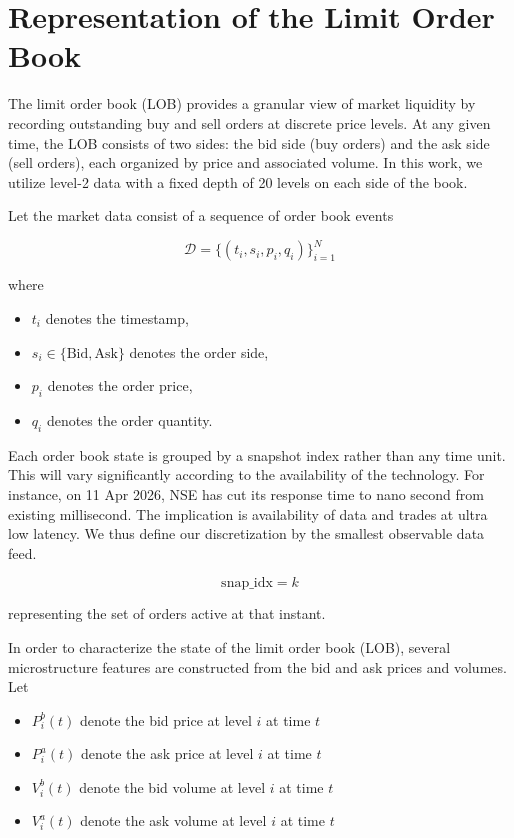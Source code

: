 \documentclass[12pt,a4paper]{report}
\begin{document}
\chapter{Representation of the Limit Order Book}

The limit order book (LOB) provides a granular view of market liquidity by recording outstanding buy and sell orders at discrete price levels. At any given time, the LOB consists of two sides: the bid side (buy orders) and the ask side (sell orders), each organized by price and associated volume. In this work, we utilize level-2 data with a fixed depth of 20 levels on each side of the book.

Let the market data consist of a sequence of order book events

\[
\mathcal{D} = \{(t_i, s_i, p_i, q_i)\}_{i=1}^{N}
\]

where

\begin{itemize}
\item $t_i$ denotes the timestamp,
\item $s_i \in \{\text{Bid}, \text{Ask}\}$ denotes the order side,
\item $p_i$ denotes the order price,
\item $q_i$ denotes the order quantity.
\end{itemize}

Each order book state is grouped by a snapshot index rather than any time unit. This will vary significantly according to the availability of the technology. For instance, on 11 Apr 2026, NSE has cut its response time to nano second from existing millisecond. The implication is  availability of data and trades at ultra low latency. We thus define our discretization by the smallest observable data feed.

\[
\text{snap\_idx} = k
\]

representing the set of orders active at that instant.

In order to characterize the state of the limit order book (LOB), several microstructure features are constructed from the bid and ask prices and volumes. Let

\begin{itemize}
\item $P_i^b(t)$ denote the bid price at level $i$ at time $t$
\item $P_i^a(t)$ denote the ask price at level $i$ at time $t$
\item $V_i^b(t)$ denote the bid volume at level $i$ at time $t$
\item $V_i^a(t)$ denote the ask volume at level $i$ at time $t$
\end{itemize}
\end{document}
